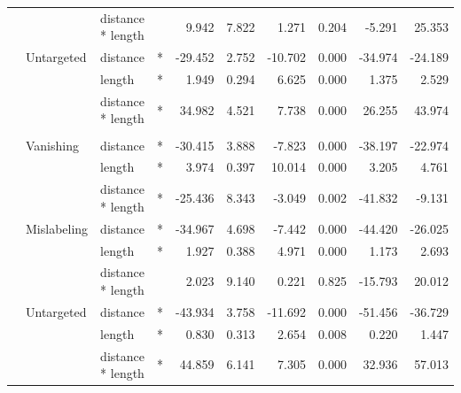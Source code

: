 \begin{longtable}[t]{llllrrrrrr}
\cmidrule{3-10}\nopagebreak
\hspace{1em} &  & distance * length &  & 9.942 & 7.822 & 1.271 & 0.204 & -5.291 & 25.353\\
\cmidrule{2-10}\nopagebreak
\hspace{1em} & Untargeted & distance & * & -29.452 & 2.752 & -10.702 & 0.000 & -34.974 & -24.189\\
\cmidrule{3-10}\nopagebreak
\hspace{1em} &  & length & * & 1.949 & 0.294 & 6.625 & 0.000 & 1.375 & 2.529\\
\cmidrule{3-10}\nopagebreak
\hspace{1em} &  & distance * length & * & 34.982 & 4.521 & 7.738 & 0.000 & 26.255 & 43.974\\
\cmidrule{1-10}\pagebreak[0]
\addlinespace[0.3em]
\multicolumn{10}{l}{\textbf{Cascade R-CNN}}\\
\hspace{1em} & Vanishing & distance & * & -30.415 & 3.888 & -7.823 & 0.000 & -38.197 & -22.974\\
\cmidrule{3-10}\nopagebreak
\hspace{1em} &  & length & * & 3.974 & 0.397 & 10.014 & 0.000 & 3.205 & 4.761\\
\cmidrule{3-10}\nopagebreak
\hspace{1em} &  & distance * length & * & -25.436 & 8.343 & -3.049 & 0.002 & -41.832 & -9.131\\
\cmidrule{2-10}\nopagebreak
\hspace{1em} & Mislabeling & distance & * & -34.967 & 4.698 & -7.442 & 0.000 & -44.420 & -26.025\\
\cmidrule{3-10}\nopagebreak
\hspace{1em} &  & length & * & 1.927 & 0.388 & 4.971 & 0.000 & 1.173 & 2.693\\
\cmidrule{3-10}\nopagebreak
\hspace{1em} &  & distance * length &  & 2.023 & 9.140 & 0.221 & 0.825 & -15.793 & 20.012\\
\cmidrule{2-10}\nopagebreak
\hspace{1em} & Untargeted & distance & * & -43.934 & 3.758 & -11.692 & 0.000 & -51.456 & -36.729\\
\cmidrule{3-10}\nopagebreak
\hspace{1em} &  & length & * & 0.830 & 0.313 & 2.654 & 0.008 & 0.220 & 1.447\\
\cmidrule{3-10}\nopagebreak
\hspace{1em} &  & distance * length & * & 44.859 & 6.141 & 7.305 & 0.000 & 32.936 & 57.013\\
\bottomrule
\end{longtable}
\endgroup{}

